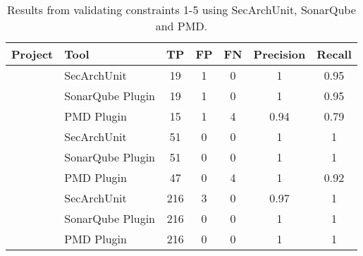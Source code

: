 \begin{table}[h]
\begin{center}
\begin{tabular}{lxggggg}
\textbf{Project}           & \textbf{Tool}    & \textbf{TP} & \textbf{FP} & \textbf{FN} & \textbf{Precision} & \textbf{Recall} \\
\hline
{}
    & SecArchUnit      & 19          & 1           & 0           & 1               & 0.95            \\
                           & SonarQube Plugin & 19          & 1           & 0           & 1               & 0.95            \\
                           & PMD Plugin       & 15          & 1           & 4           & 0.94               & 0.79            \\
\hline
{}
 & SecArchUnit      & 51          & 0           & 0           & 1                  & 1               \\
                           & SonarQube Plugin & 51          & 0           & 0           & 1                  & 1               \\
                           & PMD Plugin       & 47          & 0           & 4           & 1                  & 0.92            \\
\hline
{}
    & SecArchUnit      & 216         & 3           & 0           & 0.97               & 1               \\
                           & SonarQube Plugin & 216         & 0           & 0           & 1                  & 1               \\
                           & PMD Plugin       & 216         & 0           & 0           & 1                  & 1 \\
\hline
\end{tabular}
\end{center}
\caption{Results from validating constraints 1-5 using SecArchUnit, SonarQube and PMD.}
\label{tab:results_comparison}
\end{table}